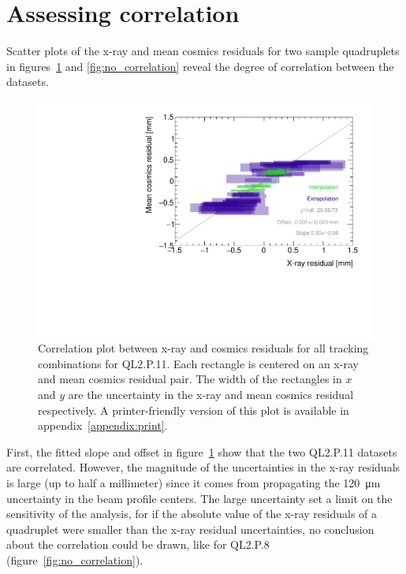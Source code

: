 \section{Assessing correlation}
\label{sec:assessing_correlation}
Scatter plots of the x-ray and mean cosmics residuals for two sample quadruplets in figures~\ref{fig:correlation} and \ref{fig:no_correlation} reveal the degree of correlation between the datasets.

\begin{figure}
    \centering
    \includegraphics[width = \textwidth]{figures/figure_QL2P11_3100V_2021-08-05_QL2P11_local_cosmic_and_xray_data_correlation_plot.pdf}
    \caption{Correlation plot between x-ray and cosmics residuals for all tracking combinations for QL2.P.11. Each rectangle is centered on an x-ray and mean cosmics residual pair. The width of the rectangles in $x$ and $y$ are the uncertainty in the x-ray and mean cosmics residual respectively. A printer-friendly version of this plot is available in appendix~\ref{appendix:print}.}
    \label{fig:correlation}
\end{figure}

First, the fitted slope and offset in figure~\ref{fig:correlation} show that the two QL2.P.11 datasets are correlated. However, the magnitude of the uncertainties in the x-ray residuals is large (up to half a millimeter) since it comes from propagating the \SI{120}{\micro\meter} uncertainty in the beam profile centers. The large uncertainty set a limit on the sensitivity of the analysis, for if the absolute value of the x-ray residuals of a quadruplet were smaller than the x-ray residual uncertainties, no conclusion about the correlation could be drawn, like for QL2.P.8 (figure~\ref{fig:no_correlation}).

